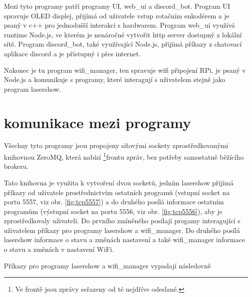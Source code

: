 \documentclass{template/socthesis}
\begin{document}
Mezi tyto programy patří programy UI, web\_ui a discord\_bot. Program UI spravuje OLED displej, přijímá od uživatele vstup rotačním enkodérem a je psaný v c++ pro jednodušší interakci s hardwarem. Program web\_ui využívá runtime Node.js, ve kterém je nenáročné vytvořit http server dostupný z lokální sítě.  Program discord\_bot, také využívající Node.js, přijímá příkazy z chatovací aplikace discord a je přístupný i přes internet.

Nakonec je tu program wifi\_manager, ten spravuje wifi připojení RPi, je psaný v Node.js a komunikuje s programy, které interagují s uživatelem stejně jako program lasershow.

\section{komunikace mezi programy} \label{comms}
Všechny tyto programy jsou propojeny síťovými sockety zprostředkovanými knihovnou ZeroMQ, která nabízí \footnote{Ve frontě jsou zprávy seřazeny od té nejdříve odeslané.}{frontu} zpráv, bez potřeby samostatně běžícího brokeru.

Tato knihovna je využita k vytvoření dvou socketů, jedním lasershow přijímá příkazy od uživatele prostřednictvím ostatních programů (vstupní socket na portu 5557, viz obr. \ref{fig:tcp5557}) a do druhého posílá informace ostatním programům (výstupní socket na portu 5556, viz obr. \ref{fig:tcp5556}), aby je zprostředkovaly uživateli. Do prvního zmíněného posílají progamy interagující s uživatelem příkazy pro programy lasershow a wifi\_manager. Do druhého posílá lasershow informace o stavu a změnách nastavení  a také wifi\_manager informace o stavu a změnách v nastavení WiFi.

Příkazy pro programy lasershow a wifi\_manager vypadají následovně
\end{document}
